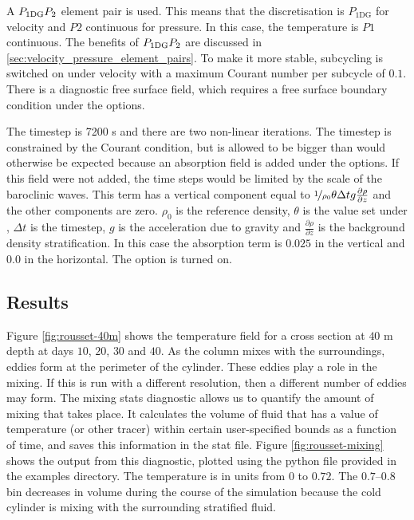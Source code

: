 A $P_{1\mathrm{DG}}P_2$ element pair is used. This means that the discretisation is $P_{1\mathrm{DG}}$ for velocity and  $P2$ continuous for pressure. In this case, the temperature is $P1$ continuous. The benefits of $P_{1\mathrm{DG}}P_2$ are discussed in \ref{sec:velocity_pressure_element_pairs}.  To make it more stable, subcycling is switched on under velocity with a maximum Courant number per subcycle of $0.1$. There is a diagnostic free surface field, which requires a free surface boundary condition under the  options.

The timestep is 7200 s and there are two non-linear iterations.  The timestep is constrained by the Courant condition, but is allowed to be bigger than would otherwise be expected because an absorption field is added under the  options.  If this field were not added, the time steps would be limited by the scale of the baroclinic waves.  This term has a vertical component equal to  ${\nicefrac{1}{\rho_0}} {\theta} {\Delta} {t} {g} {\frac{\partial \rho}{\partial z}}$ and the other components are zero. $\rho_0$ is the reference density, $\theta$ is the value set under , ${\Delta} {t} $ is the timestep, $g$ is the acceleration due to gravity and $\frac{\partial \rho}{\partial z}$ is the background density stratification.   In this case the absorption term is $0.025$ in the vertical and $0.0$ in the horizontal. The  option is turned on.

\subsection{Results}

Figure \ref{fig:rousset-40m} shows the temperature field for a cross section at $40$ m depth at days $10$, $20$, $30$ and $40$. As the column mixes with the surroundings, eddies form at the perimeter of the cylinder. These eddies play a role in the mixing. If this is run with a different resolution, then a different number of eddies may form. The mixing stats diagnostic allows us to quantify the amount of mixing that takes place. It calculates the volume of fluid that has a value of temperature (or other tracer) within certain user-specified bounds as a function of time, and saves this information in the stat file. Figure \ref{fig:rousset-mixing} shows the output from this diagnostic, plotted using the python file provided in the examples directory. The temperature is in units from $0$ to $0.72$. The $0.7$--$0.8$ bin decreases in volume during the course of the simulation because the cold cylinder is mixing with the surrounding stratified fluid.


